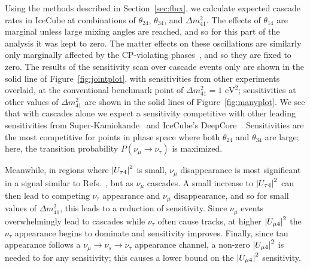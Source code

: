 \documentclass[main.tex]{subfiles}
\begin{document}
Using the methods described in Section~\ref{sec:flux}, we calculate expected cascade rates in IceCube at combinations of $\theta_{24}$, $\theta_{34}$, and $\Delta m_{41}^{2}$. 
The effects of $\theta_{14}$ are marginal unless large mixing angles are reached, and so for this part of the analysis it was kept to zero. 
The matter effects on these oscillations are similarly only marginally affected by the CP-violating phases~\cite{Aartsen_2020_prd}, and so they are fixed to zero.
The results of the sensitivity scan over cascade events only are shown in the solid line of Figure~\ref{fig:jointplot}, with sensitivities from other experiments overlaid, at the conventional benchmark point of $\Delta m^2_{41}=1\text{ eV}^2$; sensitivities at other values of $\Delta m^{2}_{41}$ are shown in the solid lines of Figure~\ref{fig:manyplot}. We see that with cascades alone we expect a sensitivity competitive with other leading sensitivities from Super-Kamiokande~\cite{PhysRevD.91.052019} and IceCube's DeepCore~\cite{Aartsen_2017_dc}. Sensitivities are the most competitive for points in phase space where both $\theta_{24}$ and $\theta_{34}$ are large; here, the transition probability $P(\nu_\mu\to\nu_{\tau})$ is maximized. 

Meanwhile, in regions where $\left| U_{\tau 4} \right|^{2}$ is small, $\nu_{\mu}$ disappearance is most significant in a signal similar to Refs.~\cite{Aartsen_2020, Aartsen_2020_prd}, but as $\nu_{\mu}$ cascades.
A small increase to $\left| U_{\tau 4} \right|^{2}$ can then lead to competing $\nu_{\tau}$ appearance and $\nu_{\mu}$ disappearance, and so for small values of $\Delta m_{41}^{2}$, this leads to a reduction of sensitivity. 
Since $\nu_{\mu}$ events overwhelmingly lead to cascades while $\nu_{\tau}$ often cause tracks, at higher $\left| U_{\mu 4} \right|^{2}$ the $\nu_{\tau}$ appearance begins to dominate and sensitivity improves.
Finally, since tau appearance follows a $\nu_{\mu}\to\nu_{s}\to\nu_{\tau}$ appearance channel, a non-zero $\left| U_{\mu 4} \right|^{2}$ is needed to for any sensitivity; this causes a lower bound on the $\left| U_{\mu 4} \right|^{2}$ sensitivity. 
\end{document}
